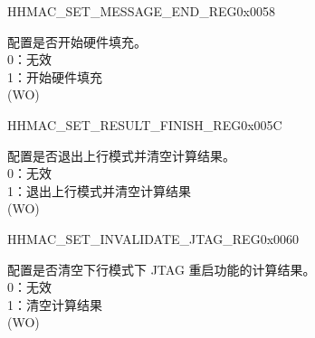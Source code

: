 \begin{register}{H}{HMAC\_SET\_MESSAGE\_END\_REG}{0x0058}\label{regdesc:HMACSETMESSAGEENDREG}
%
%
\regnewline%
\begin{regdesc}\begin{reglist}
\label{fielddesc:HMACSETTEXTEND}\item [HMAC\_SET\_TEXT\_END] 配置是否开始硬件填充。
\\0：无效
\\1：开始硬件填充
\\(WO)
\end{reglist}\end{regdesc}
\end{register}


\begin{register}{H}{HMAC\_SET\_RESULT\_FINISH\_REG}{0x005C}\label{regdesc:HMACSETRESULTFINISHREG}
%
%
\regnewline%
\begin{regdesc}\begin{reglist}
\label{fielddesc:HMACSETRESULTEND}\item [HMAC\_SET\_RESULT\_END] 配置是否退出上行模式并清空计算结果。
\\0：无效
\\1：退出上行模式并清空计算结果
\\(WO)
\end{reglist}\end{regdesc}
\end{register}


\begin{register}{H}{HMAC\_SET\_INVALIDATE\_JTAG\_REG}{0x0060}\label{regdesc:HMACSETINVALIDATEJTAGREG}
%
%
\regnewline%
\begin{regdesc}\begin{reglist}
\label{fielddesc:HMACSETINVALIDATEJTAG}\item [HMAC\_SET\_INVALIDATE\_JTAG] 配置是否清空下行模式下 JTAG 重启功能的计算结果。
\\0：无效
\\1：清空计算结果
\\(WO)
\end{reglist}\end{regdesc}
\end{register}


